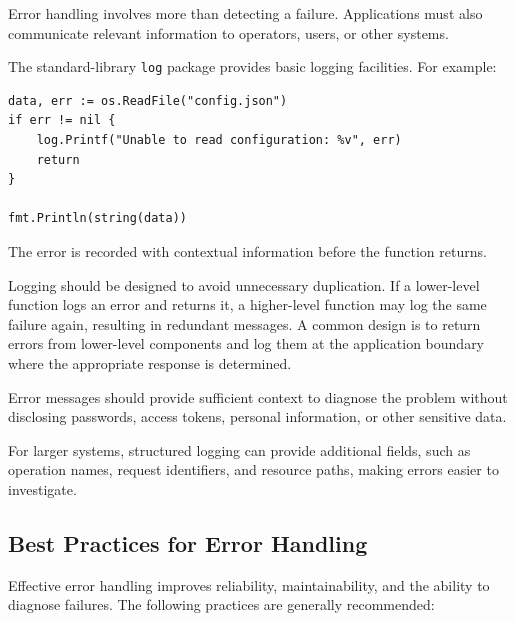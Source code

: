 Error handling involves more than detecting a failure. Applications must also communicate relevant information to operators, users, or other systems.

The standard-library \texttt{log} package provides basic logging facilities. For example:

\begin{lstlisting}
data, err := os.ReadFile("config.json")
if err != nil {
    log.Printf("Unable to read configuration: %v", err)
    return
}

fmt.Println(string(data))
\end{lstlisting}

The error is recorded with contextual information before the function returns.

Logging should be designed to avoid unnecessary duplication. If a lower-level function logs an error and returns it, a higher-level function may log the same failure again, resulting in redundant messages. A common design is to return errors from lower-level components and log them at the application boundary where the appropriate response is determined.

Error messages should provide sufficient context to diagnose the problem without disclosing passwords, access tokens, personal information, or other sensitive data.

For larger systems, structured logging can provide additional fields, such as operation names, request identifiers, and resource paths, making errors easier to investigate.

\subsection{Best Practices for Error Handling}

Effective error handling improves reliability, maintainability, and the ability to diagnose failures. The following practices are generally recommended:


